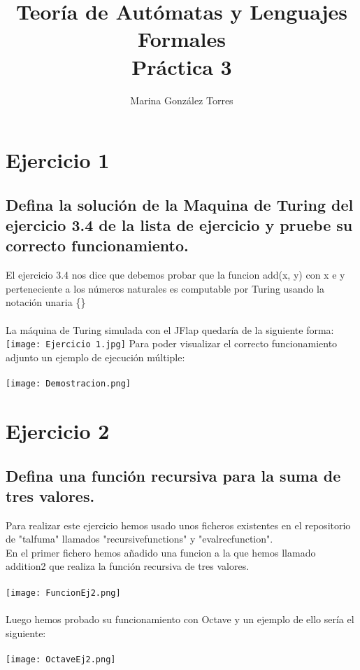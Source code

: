 \documentclass{article}
\title{Teoría de Autómatas y Lenguajes Formales\\[.4\baselineskip]Práctica 3}
\author{Marina González Torres}
\date{}
\begin{document}
\maketitle

\section*{Ejercicio 1}
\subsection*{Defina la solución de la Maquina de Turing del ejercicio 3.4 de la lista de ejercicio y pruebe su correcto funcionamiento.}
El ejercicio 3.4 nos dice que debemos probar que la funcion add(x, y) con x e y perteneciente a los números naturales es computable por Turing usando la notación unaria \{\}
\\
\\ La máquina de Turing simulada con el JFlap quedaría de la siguiente forma:
\\ \texttt{[image: Ejercicio 1.jpg]}
Para poder visualizar el correcto funcionamiento adjunto un ejemplo 
 de ejecución múltiple:
\\
\\ \texttt{[image: Demostracion.png]}

\section*{Ejercicio 2}
\subsection*{Defina una función recursiva para la suma de tres valores.}
Para realizar este ejercicio hemos usado unos ficheros existentes en el repositorio de "talfuma" llamados "recursivefunctions" y "evalrecfunction".
\\ En el primer fichero hemos añadido una funcion a la que hemos llamado addition2 que realiza la función recursiva de tres valores.
\\
\\ \texttt{[image: FuncionEj2.png]}
\\
\\ Luego hemos probado su funcionamiento con Octave y un ejemplo de ello sería el siguiente:
\\
\\ \texttt{[image: OctaveEj2.png]}
\\
\end{document}
